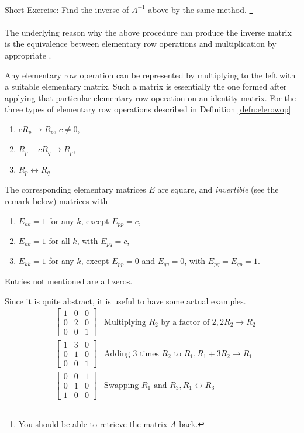Short Exercise: Find the inverse of $A^{-1}$ above by the same method. \footnote{You should be able to retrieve the matrix $A$ back.}\\
\\
The underlying reason why the above procedure can produce the inverse matrix is the equivalence between elementary row operations and multiplication by appropriate .
\begin{proper}
\label{proper:elementarymat}
Any elementary row operation can be represented by multiplying to the left with a suitable elementary matrix. Such a matrix is essentially the one formed after applying that particular elementary row operation on an identity matrix. For the three types of elementary row operations described in Definition \ref{defn:elerowop}
\begin{enumerate}
\item $cR_{p} \to R_{p}$, $c \neq 0$,
\item $R_{p} + cR_{q} \to R_{p}$,
\item $R_{p} \leftrightarrow R_{q}$
\end{enumerate}
The corresponding elementary matrices $E$ are square, and \textit{invertible} (see the remark below) matrices with
\begin{enumerate}
\item $E_{kk} = 1$ for any $k$, except $E_{pp} = c$,
\item $E_{kk} = 1$ for all $k$, with $E_{pq} = c$,
\item $E_{kk} = 1$ for any $k$, except $E_{pp} = 0$ and $E_{qq} = 0$, with $E_{pq} = E_{qp} = 1$. 
\end{enumerate}
Entries not mentioned are all zeros.
\end{proper}
Since it is quite abstract, it is useful to have some actual examples.
\begin{align*}
&
\begin{bmatrix}
1 & 0 & 0 \\
0 & 2 & 0 \\
0 & 0 & 1
\end{bmatrix} & \text{Multiplying $R_2$ by a factor of $2$}, 2R_2 \to R_2 \\
&
\begin{bmatrix}
1 & 3 & 0 \\
0 & 1 & 0 \\
0 & 0 & 1
\end{bmatrix} & \text{Adding 3 times $R_2$ to $R_1$}, R_1 + 3R_2 \to R_1 \\
&
\begin{bmatrix}
0 & 0 & 1 \\
0 & 1 & 0 \\
1 & 0 & 0
\end{bmatrix} & \text{Swapping $R_1$ and $R_3$}, R_1 \leftrightarrow R_3 
\end{align*}
